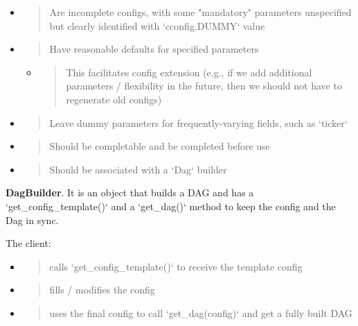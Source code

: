 \documentclass[11pt, reqno]{amsart}
\begin{document}
\begin{itemize}
\item
  \begin{quote}
  Are incomplete configs, with some "mandatory" parameters unspecified
  but clearly identified with `cconfig.DUMMY` value
  \end{quote}
\item
  \begin{quote}
  Have reasonable defaults for specified parameters
  \end{quote}

  \begin{itemize}
  \item
    \begin{quote}
    This facilitates config extension (e.g., if we add additional
    parameters / flexibility in the future, then we should not have to
    regenerate old configs)
    \end{quote}
  \end{itemize}
\item
  \begin{quote}
  Leave dummy parameters for frequently-varying fields, such as `ticker`
  \end{quote}
\item
  \begin{quote}
  Should be completable and be completed before use
  \end{quote}
\item
  \begin{quote}
  Should be associated with a `Dag` builder
  \end{quote}
\end{itemize}

\textbf{DagBuilder}. It is an object that builds a DAG and has a
`get\_config\_template()` and a `get\_dag()` method to keep the config
and the Dag in sync.

The client:

\begin{itemize}
\item
  \begin{quote}
  calls `get\_config\_template()` to receive the template config
  \end{quote}
\item
  \begin{quote}
  fills / modifies the config
  \end{quote}
\item
  \begin{quote}
  uses the final config to call `get\_dag(config)` and get a fully built
  DAG
  \end{quote}
\end{itemize}
\end{document}
